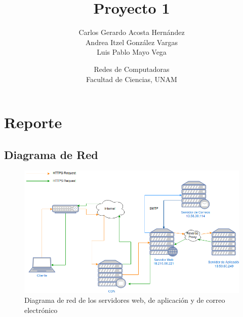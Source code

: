 \documentclass[9pt]{article}
\title{Proyecto 1}
\author{Carlos Gerardo Acosta Hernández \\ Andrea Itzel González Vargas \\ Luis Pablo Mayo Vega}
\date{Redes de Computadoras\\Facultad de Ciencias, UNAM}
\begin{document}
\maketitle

\section*{Reporte}

\subsection*{Diagrama de Red}
\begin{figure}[ht!]
  \centering
  \includegraphics[width=\textwidth]{net_diagram}
  \caption{Diagrama de red de los servidores web, de aplicación y de correo electrónico}
\end{figure}
\end{document}
